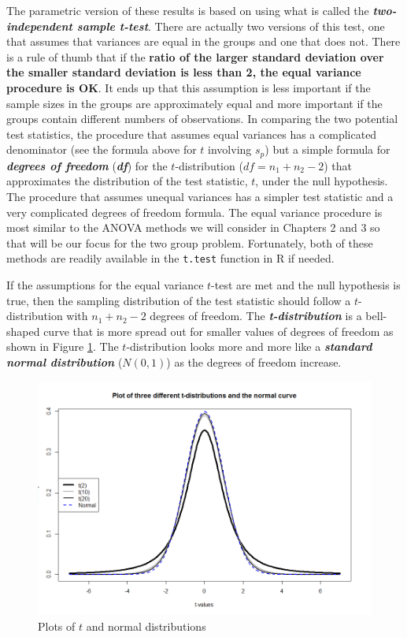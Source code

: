 \documentclass[]{book}
\begin{document}
The parametric version of these results is based on using what is called
the \textbf{\emph{two-independent sample t-test}}. There are actually
two versions of this test, one that assumes that variances are equal in
the groups and one that does not. There is a rule of thumb that if the
\textbf{ratio of the larger standard deviation over the smaller standard
deviation is less than 2, the equal variance procedure is OK}. It ends
up that this assumption is less important if the sample sizes in the
groups are approximately equal and more important if the groups contain
different numbers of observations. In comparing the two potential test
statistics, the procedure that assumes equal variances has a complicated
denominator (see the formula above for \(t\) involving \(s_p\)) but a
simple formula for \textbf{\emph{degrees of freedom}}
(\textbf{\emph{df}}) for the \(t\)-distribution (\(df=n_1+n_2-2\)) that
approximates the distribution of the test statistic, \(t\), under the
null hypothesis. The procedure that assumes unequal variances has a
simpler test statistic and a very complicated degrees of freedom
formula. The equal variance procedure is most similar to the ANOVA
methods we will consider in Chapters 2 and 3 so that will be our focus
for the two group problem. Fortunately, both of these methods are
readily available in the \texttt{t.test} function in R if needed.

If the assumptions for the equal variance \(t\)-test are met and the
null hypothesis is true, then the sampling distribution of the test
statistic should follow a \(t\)-distribution with \(n_1+n_2-2\) degrees
of freedom. The \textbf{\emph{t-distribution}} is a bell-shaped curve
that is more spread out for smaller values of degrees of freedom as
shown in Figure \ref{fig:Figure2-13}. The \(t\)-distribution looks more
and more like a \textbf{\emph{standard normal distribution}}
(\(N(0,1)\)) as the degrees of freedom increase.



\begin{figure}
\includegraphics[width=13.33in]{chapter1_files/image045} \caption{Plots of \(t\) and normal distributions}\label{fig:Figure2-13}
\end{figure}
\end{document}
